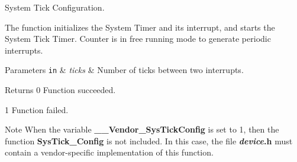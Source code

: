 System Tick Configuration. 

The function initializes the System Timer and its interrupt, and starts the System Tick Timer. Counter is in free running mode to generate periodic interrupts.


\begin{DoxyParams}[1]{Parameters}
\mbox{\tt in}  & {\em ticks} & Number of ticks between two interrupts.\\
\hline
\end{DoxyParams}
\begin{DoxyReturn}{Returns}
0 Function succeeded. 

1 Function failed.
\end{DoxyReturn}
\begin{DoxyNote}{Note}
When the variable {\bfseries \+\_\+\+\_\+\+Vendor\+\_\+\+Sys\+Tick\+Config} is set to 1, then the function {\bfseries Sys\+Tick\+\_\+\+Config} is not included. In this case, the file {\bfseries {\itshape device}.h} must contain a vendor-\/specific implementation of this function. 
\end{DoxyNote}
